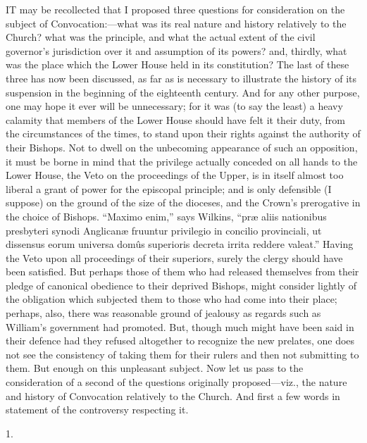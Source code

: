 
IT
may be recollected that I proposed three questions for consideration
on the subject of Convocation:—what was its real nature and history
relatively to the Church? what was the principle, and what the actual
extent of the civil governor's jurisdiction over it and assumption of
its powers? and, thirdly, what was the place which the Lower House
held in its constitution? The last of these three has now been
discussed, as far as is necessary to illustrate the history of its
suspension in the beginning of the eighteenth century. And for any
other purpose, one may hope it ever will be unnecessary; for it was
(to say the least) a heavy calamity that members of the Lower House
should have felt it their duty, from the circumstances of the times,
to stand upon their rights against the authority of their Bishops. Not
to dwell on the unbecoming appearance of such an opposition, it must
be borne in mind that the privilege actually conceded on all hands to
the Lower House, the Veto on the proceedings of the Upper, is in
itself almost too liberal a grant of power for the episcopal
principle; and is only defensible (I suppose) on the ground of the
size of the dioceses, and the Crown's prerogative in the choice of
Bishops. ``Maximo enim,'' says Wilkins, ``præ aliis nationibus
presbyteri synodi Anglicanæ fruuntur privilegio in concilio
provinciali, ut dissensus eorum universa domûs superioris decreta
irrita reddere valeat.'' Having the Veto upon all proceedings of their
superiors, surely the clergy should have been satisfied. But
perhaps those of them who had released themselves from their pledge of
canonical obedience to their deprived Bishops, might consider lightly
of the obligation which subjected them to those who had come into
their place; perhaps, also, there was reasonable ground of jealousy as
regards such as William's government had promoted. But, though much
might have been said in their defence had they refused altogether to
recognize the new prelates, one does not see the consistency of taking
them for their rulers and then not submitting to them. But enough on
this unpleasant subject. Now let us pass to the consideration of a
second of the questions originally proposed—viz., the nature and
history of Convocation relatively to the Church. And first a few words
in statement of the controversy respecting it.

1.

